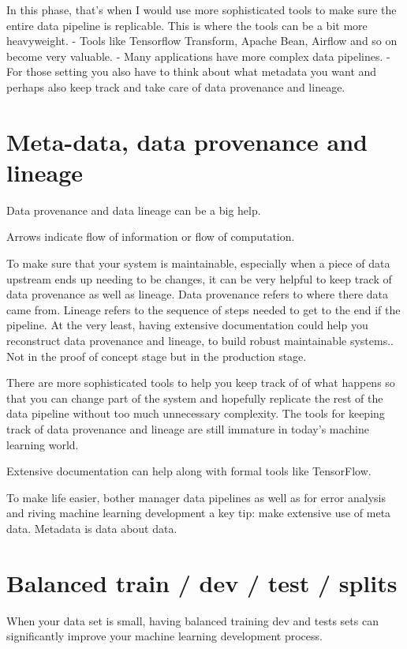 In this phase, that's when I would use more sophisticated tools to make sure the entire data pipeline is replicable.
This is where the tools can be a bit more heavyweight.
- Tools like Tensorflow Transform, Apache Bean, Airflow and so on become very valuable.
- Many applications have more complex data pipelines.
- For those setting you also have to think about what metadata you want and perhaps also keep track and take care of data provenance and lineage.

\section{Meta-data, data provenance and lineage}

Data provenance and data lineage can be a big help.


Arrows indicate flow of information or flow of computation.

To make sure that your system is maintainable, especially when a piece of data upstream ends up needing to be changes, it can be very helpful to keep track of data provenance as well as lineage.
Data provenance refers to where there data came from.
Lineage refers to the sequence of steps needed to get to the end if the pipeline.
At the very least, having extensive documentation could help you reconstruct data provenance and lineage, to build robust maintainable systems.. Not in the proof of concept stage but in the production stage.

There are more sophisticated tools to help you keep track of of what happens so that you can change part of the system and hopefully replicate the rest of the data pipeline without too much unnecessary complexity.
The tools for keeping track of data provenance and lineage are still immature in today's machine learning world.

Extensive documentation can help along with formal tools like TensorFlow.

To make life easier, bother manager data pipelines as well as for error analysis and riving machine learning development a key tip: make extensive use of meta data.
Metadata is data about data.

\section{Balanced train / dev / test / splits}

When your data set is small, having balanced training dev and tests sets can significantly improve your machine learning development process.

